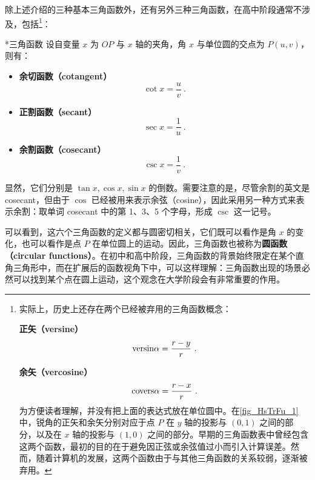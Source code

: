 除上述介绍的三种基本三角函数外，还有另外三种三角函数，在高中阶段通常不涉及，包括\footnote{实际上，历史上还存在两个已经被弃用的三角函数概念：

\textbf{正矢（versine）}\begin{equation}
\mathrm{versin }\alpha=\displaystyle{r-y\over r}~.
\end{equation}

\textbf{余矢（vercosine）}
\begin{equation}
\mathrm{covers }\alpha=\displaystyle{r-x\over r}~.
\end{equation}
为方便读者理解，并没有把上面的表达式放在单位圆中。在\autoref{fig_HsTrFu_1} 中，锐角的正矢和余矢分别对应于点 $P$ 在 $y$ 轴的投影与 $(0,1)$ 之间的部分，以及在 $x$ 轴的投影与 $(1,0)$ 之间的部分。早期的三角函数表中曾经包含这两个函数，最初的目的在于避免因正弦或余弦值过小而引入计算误差。然而，随着计算机的发展，这两个函数由于与其他三角函数的关系较弱，逐渐被弃用。}：
\begin{definition}{*三角函数}\label{def_HsTrFu_2}
设自变量 $x$ 为 $OP$ 与 $x$ 轴的夹角，角 $x$ 与单位圆的交点为 $P(u,v)$，则有：
\begin{itemize}
\item \textbf{余切函数（cotangent）}
\begin{equation} 
\displaystyle\cot x= \frac{u}{v}~.
\end{equation}
\item \textbf{正割函数（secant）}
\begin{equation}
\displaystyle\sec x = \frac{1}{u}~.
\end{equation}
\item \textbf{余割函数（cosecant）}
\begin{equation}
\displaystyle\csc x = \frac{1}{v}~.
\end{equation}
\end{itemize}
\end{definition}

显然，它们分别是 $\tan x, \cos x, \sin x$ 的倒数。需要注意的是，尽管余割的英文是 cosecant，但由于 $\cos$ 已经被用来表示余弦（cosine），因此采用另一种方式来表示余割：取单词 cosecant 中的第 1、3、5 个字母，形成 $\csc$ 这一记号。

可以看到，这六个三角函数的定义都与圆密切相关，它们既可以看作是角 $x$ 的变化，也可以看作是点 $P$ 在单位圆上的运动。因此，三角函数也被称为\textbf{圆函数（circular functions）}。在初中和高中阶段，三角函数的背景始终限定在某个直角三角形中，而在扩展后的函数视角下中，可以这样理解：三角函数出现的场景必然可以找到某个点在圆上运动，这个观念在大学阶段会有非常重要的作用。

